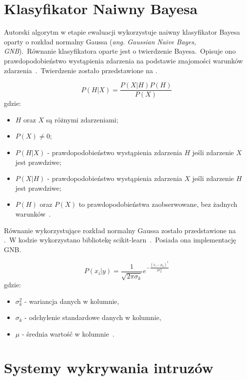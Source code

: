 \section{Klasyfikator Naiwny Bayesa}
Autorski algorytm w etapie ewaluacji wykorzystuje naiwny klasyfikator Bayesa oparty o rozkład normalny Gaussa (\textit{ang. Gaussian Naive Bayes, GNB}).\ Równanie klasyfikatora oparte jest o twierdzenie Bayesa.\ Opisuje ono prawdopodobieństwo wystąpienia zdarzenia na podstawie znajomości warunków zdarzenia~\cite{Joyce2003}.\ Twierdzenie zostało przedstawione na .

\begin{equation}\label{math:bayes}
P(H|X) = \frac{P(X|H) P(H)}{P(X)}
\end{equation}
gdzie:
\begin{itemize}
    \item $H$ oraz $X$ są różnymi zdarzeniami;
    \item $P(X) \neq 0$;
    \item $P(H|X)$ - prawdopodobieństwo wystąpienia zdarzenia $H$ jeśli zdarzenie $X$ jest prawdziwe;
    \item $P(X|H)$ - prawdopodobieństwo wystąpienia zdarzenia $X$ jeśli zdarzenie $H$ jest prawdziwe;
    \item $P(H)$ oraz $P(X)$ to prawdopodobieństwa zaobserwowane, bez żadnych warunków~\cite{Leung2007}.
\end{itemize}

Równanie wykorzystujące rozkład normalny Gaussa zostało przedstawione na .\ W kodzie wykorzystano bibliotekę scikit-learn~\cite{scikit-learn}.\ Posiada ona implementację GNB.

\begin{equation}\label{math:gnb}
    P(x_{i}|y) = \frac{1}{\sqrt{2\pi\sigma_{k}}}e^{-\frac{(x_{i}-\mu_{k})^2}{2\sigma_{k}^{2}}}
\end{equation}
gdzie:
\begin{itemize}
        \item[] \textbf{$\sigma_{k}^{2}$} - wariancja danych w kolumnie,
        \item[] \textbf{$\sigma_{k}$} - odchylenie standardowe danych w kolumnie,
        \item[] \textbf{$\mu$} - średnia wartość w kolumnie~\cite{Leung2007}.
\end{itemize}

\section{Systemy wykrywania intruzów}

